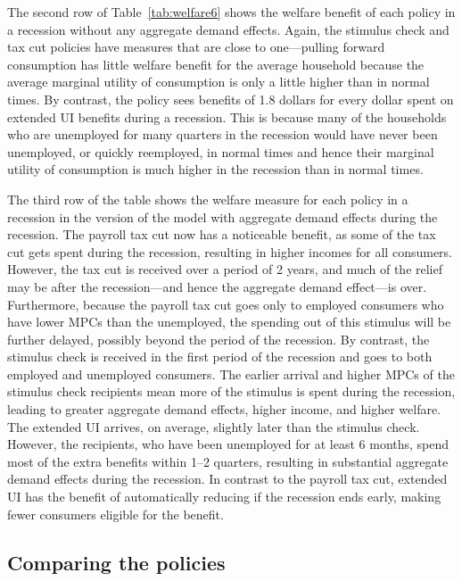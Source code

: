 \documentclass[\latexroot/\projectname]{subfiles}
\begin{document}
The second row of Table~\ref{tab:welfare6} shows the welfare benefit of each policy in a recession without any aggregate demand effects.
Again, the stimulus check and tax cut policies have measures that are close to one---pulling forward consumption has little welfare benefit for the average household because the average marginal utility of consumption is only a little higher than in normal times.
By contrast, the policy sees benefits of 1.8 dollars for every dollar spent on extended UI benefits during a recession.
This is because many of the households who are unemployed for many quarters in the recession would have never been unemployed, or quickly reemployed, in normal times and hence their marginal utility of consumption is much higher in the recession than in normal times.

The third row of the table shows the welfare measure for each policy in a recession in the version of the model with aggregate demand effects during the recession.
The payroll tax cut now has a noticeable benefit, as some of the tax cut gets spent during the recession, resulting in higher incomes for all consumers.
However, the tax cut is received over a period of 2 years, and much of the relief may be after the recession---and hence the aggregate demand effect---is over.
Furthermore, because the payroll tax cut goes only to employed consumers who have lower MPCs than the unemployed, the spending out of this stimulus will be further delayed, possibly beyond the period of the recession.
By contrast, the stimulus check is received in the first period of the recession and goes to both employed and unemployed consumers.
The earlier arrival and higher MPCs of the stimulus check recipients mean more of the stimulus is spent during the recession, leading to greater aggregate demand effects, higher income, and higher welfare.
The extended UI arrives, on average, slightly later than the stimulus check.
However, the recipients, who have been unemployed for at least 6 months, spend most of the extra benefits within 1--2 quarters, resulting in substantial aggregate demand effects during the recession.
In contrast to the payroll tax cut, extended UI has the benefit of automatically reducing if the recession ends early, making fewer consumers eligible for the benefit.

\subsection{Comparing the policies}
\whenintegrated{\label{subsec:comparing-the-policies}} %
\end{document}
